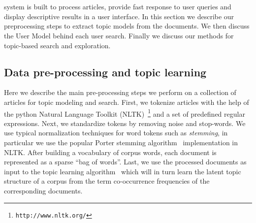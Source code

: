 \section{\system}


{\system} system is built to process articles,
provide fast response to user queries and display descriptive
results in a user interface.
In this section we describe our preprocessing steps to extract
topic models from the documents.
We then discuss the User Model behind each user search.
Finally we discuss our methods for topic-based search and exploration.



\subsection{Data pre-processing and topic learning}

Here we describe the main pre-processing steps we perform on a 
collection of articles for topic modeling and search. First, 
we tokenize articles with the help of the python 
Natural Language Toolkit (NLTK)~\footnote{\texttt{http://www.nltk.org/}} and a set of 
predefined regular expressions. Next, we standardize tokens by 
removing noise and stop-words. We use typical normalization 
techniques for word tokens such as \textsl{stemming}, in particular we use the popular Porter stemming algorithm~\cite{Porter1980} 
implementation in NLTK\@. 
After building a vocabulary of corpus words, each document is represented as a sparse ``bag of words''.
Last, we use the processed documents as input to the topic 
learning algorithm~\cite{hoffman2010online} which will in turn learn 
the latent topic structure of a corpus from the term co-occurrence 
frequencies of the corresponding documents. %



